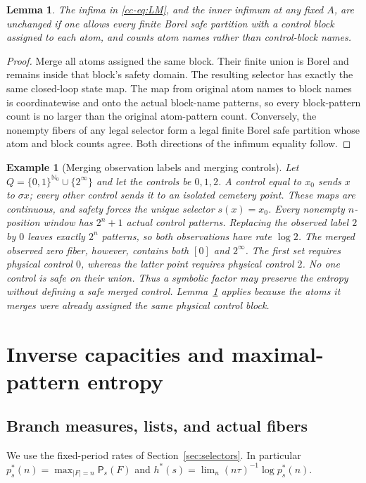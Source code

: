 \documentclass[11pt,reqno]{amsart}
\numberwithin{equation}{section}
\newtheorem{lemma}[theorem]{Lemma}
\newtheorem{example}[theorem]{Example}
\theoremstyle{definition}
\newcommand{\Nzero}{\mathbb N_0}
\newcommand{\Patt}{\mathsf P}
\begin{document}
\begin{lemma}\label{cc-lem:merge}
The infima in \eqref{cc-eq:LM}, and the inner infimum at any fixed $A$, are
unchanged if one allows every finite Borel safe partition with a
control block assigned to each atom, and counts atom names rather than
control-block names.
\end{lemma}
\begin{proof}
Merge all atoms assigned the same block. Their finite union is Borel
and remains inside that block's safety domain. The resulting selector
has exactly the same closed-loop state map. The map from original atom
names to block names is coordinatewise and onto the actual block-name
patterns, so every block-pattern count is no larger than the original
atom-pattern count. Conversely, the nonempty fibers of any legal
selector form a legal finite Borel safe partition whose atom and
block counts agree. Both directions of the infimum equality follow.
\end{proof}



\begin{example}[Merging observation labels and merging controls]
\label{ex:physical-merge}
Let $Q=\{0,1\}^{\Nzero}\cup\{2^\infty\}$ and let the controls
be $0,1,2$. A control equal to $x_0$ sends $x$ to $\sigma x$;
every other control sends it to an isolated cemetery point.
These maps are continuous, and safety forces the unique selector
$s(x)=x_0$. Every nonempty $n$-position window has $2^n+1$ actual control
patterns. Replacing the observed label $2$ by $0$ leaves exactly
$2^n$ patterns, so both observations have rate $\log2$.
The merged observed zero fiber, however, contains both $[0]$ and
$2^\infty$. The first set requires physical control $0$, whereas
the latter point requires physical control $2$. No one control is
safe on their union. Thus a symbolic factor may preserve the entropy
without defining a safe merged control. Lemma~\ref{cc-lem:merge}
applies because the atoms it merges were already assigned the
\emph{same} physical control block.
\end{example}


\section{Inverse capacities and maximal-pattern entropy}\label{sec:capacity}

\subsection{Branch measures, lists, and actual fibers}
We use the fixed-period rates of Section~\ref{sec:selectors}.
In particular $p_s^*(n)=\max_{|F|=n}\Patt_s(F)$ and
$h^*(s)=\lim_n(n\tau)^{-1}\log p_s^*(n)$.
\end{document}
